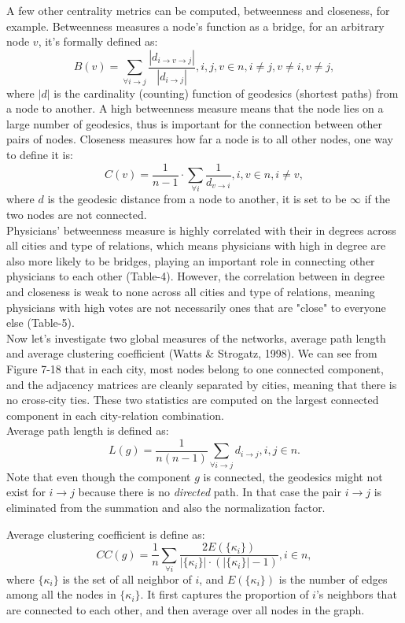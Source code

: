 \documentclass[11pt]{article}
\begin{document}
A few other centrality metrics can be computed, betweenness and closeness, for example. Betweenness measures a node's function as a bridge, for an arbitrary node $v$, it's formally defined as:
$$B(v) = \sum_{\forall i \to j} \frac{|d_{i \to v \to j}|}{|d_{i \to j}|}, i,j,v \in n, i \not= j, v \not= i, v \not= j,$$ where $|d|$ is the cardinality (counting) function of geodesics (shortest paths) from a node to another. A high betweenness measure means that the node lies on a large number of geodesics, thus is important for the connection between other pairs of nodes. Closeness measures how far a node is to all other nodes, one way to define it is:
$$C(v)=\frac{1}{n-1}\cdot \sum_{\forall i} \frac{1}{d_{v \to i}}, i,v \in n, i \not= v, $$ where $d$ is the geodesic distance from a node to another, it is set to be $\infty$ if the two nodes are not connected.\\

Physicians' betweenness measure is highly correlated with their in degrees across all cities and type of relations, which means physicians with high in degree are also more likely to be bridges, playing an important role in connecting other physicians to each other (Table-4). However, the correlation between in degree and closeness is weak to none across all cities and type of relations, meaning physicians with high votes are not necessarily ones that are "close" to everyone else (Table-5).\\

Now let's investigate two global measures of the networks, average path length and average clustering coefficient (Watts \& Strogatz, 1998). We can see from Figure 7-18 that in each city, most nodes belong to one connected component, and the adjacency matrices are cleanly separated by cities, meaning that there is no cross-city ties. These two statistics are computed on the largest connected component in each city-relation combination.\\

Average path length is defined as: 
$$L(g) = \frac{1}{n(n-1)}\sum_{\forall i \to j}d_{i \to j}, i,j \in n.$$
Note that even though the component $g$ is connected, the geodesics might not exist for $i \to j$ because there is no \emph{directed} path. In that case the pair $i \to j$ is eliminated from the summation and also the normalization factor. 

Average clustering coefficient is define as:
$$CC(g) = \frac{1}{n}\sum_{\forall i} \frac{2E(\{\kappa_i\})}{|\{\kappa_i\}|\cdot(|\{\kappa_i\}|-1)}, i \in n,$$
where $\{\kappa_i\}$ is the set of all neighbor of $i$, and $E(\{\kappa_i\})$ is the number of edges among all the nodes in $\{\kappa_i\}$. It first captures the proportion of $i$'s neighbors that are connected to each other, and then average over all nodes in the graph.\\
\end{document}
